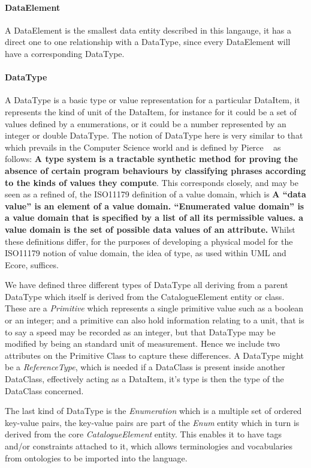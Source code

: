 \documentclass{llncs}
\begin{document}
	\paragraph{DataElement}
	A DataElement is the smallest data entity described in this langauge, it has a direct one to one relationship with a DataType, since every DataElement will have a corresponding DataType. 
	
	\paragraph{DataType}
	A DataType is a basic type or value representation for a particular DataItem, it represents the kind of unit of the DataItem, for instance for it could be a set of values defined by a enumerations, or it could be a number represented by an integer or double DataType. The notion of DataType here is very similar to that which prevails in the Computer Science world and is defined by Pierce  ~\cite{Pierce} as follows:
	\textbf{A type system is a tractable synthetic method for proving the absence of certain program behaviours by classifying phrases according to the kinds of values they compute}. This corresponds closely, and may be seen as a refined of, the ISO11179 definition of a value domain, which is \textbf{A “data value” is an element of a value domain. “Enumerated value domain” is a value domain that is specified by a list of all its permissible values. a value domain is the set of possible data values of an attribute. } Whilst these definitions differ, for the purposes of developing a physical model for the ISO11179 notion of value domain, the idea of type, as used within UML and Ecore, suffices.
	
	We have defined three different types of DataType all deriving from a parent DataType which itself is derived from the CatalogueElement entity or class. These are a \emph{Primitive} which represents a single primitive value such as a boolean or an integer; and a primitive can also hold information relating to a unit, that is to say a speed may be recorded as an integer, but that DataType may be modified by being an standard unit of measurement. Hence we include two attributes on the Primitive Class to capture these differences. A DataType might be a \emph{ReferenceType}, which is needed if a DataClass is present inside another DataClass, effectively acting as a DataItem, it's type is then the type of the DataClass concerned. 
	
	The last kind of DataType is the \emph{Enumeration} which is a multiple set of ordered key-value pairs, the key-value pairs are part of the \emph{Enum} entity which in turn is derived from the core \emph{CatalogueElement} entity. This enables it to have tags and/or constraints attached to it, which allows terminologies and vocabularies from ontologies to be imported into the language.
	
\end{document}
